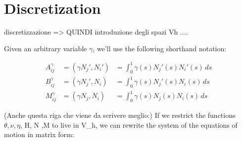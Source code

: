 

\section{Discretization}\label{matrix-form-of-the-weak-formulation}

discretizzazione => QUINDI introduzione degli spazi Vh ....

Given an arbitrary variable $\gamma$, we’ll use the following shorthand notation:

\begin{equation}
  \label{eq:2}
  \begin{aligned}
   A^\gamma_{ij} & = (\gamma N_j', N_i') &  = \int_0^1 \gamma(s) N_j'(s)
    N_i'(s) \, ds \\
     B^\gamma_{ij} & = (\gamma N_j', N_i) & = \int_0^1 \gamma(s) N_j'(s)
    N_i(s) \, ds \\
     M^\gamma_{ij} & = (\gamma N_j, N_i) & = \int_0^1 \gamma(s) N_j(s)
    N_i(s) \, ds 
  \end{aligned}
\end{equation}

(Anche questa riga che viene da scrivere meglio:)
If we restrict the functions $\theta, \nu, \eta$, H, N ,M to live in V_h, we
can rewrite the system of the equations of motion in matrix form:

